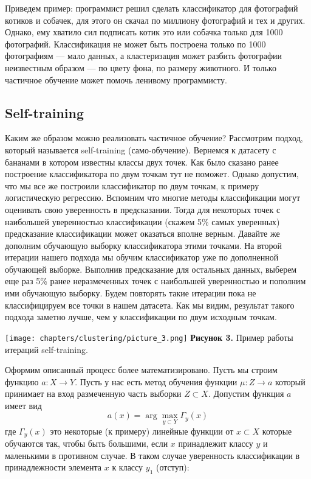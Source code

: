 Приведем пример: программист решил сделать классификатор для фотографий котиков и собачек, для этого он скачал по миллиону фотографий и тех и других. Однако, ему хватило сил подписать котик это или собачка только для 1000 фотографий. Классификация не может быть построена только по 1000 фотографиям --- мало данных, а кластеризация может разбить фотографии неизвестным образом --- по цвету фона, по размеру животного. И только частичное обучение может помочь ленивому программисту.
\subsection{Self-training}
Каким же образом можно реализовать частичное обучение? Рассмотрим подход, который называется self-training (само-обучение). Вернемся к датасету с бананами в котором известны классы двух точек. Как было сказано ранее построение классификатора по двум точкам тут не поможет. Однако допустим, что мы все же построили классификатор по двум точкам, к примеру логистическую регрессию. Вспомним что многие методы классификации могут оценивать свою уверенность в предсказании. Тогда для некоторых точек с наибольшей уверенностью классификации (скажем 5\% самых уверенных) предсказание  классификации может оказаться вполне верным. Давайте же дополним обучающую выборку классификатора этими точками. На второй итерации нашего подхода мы обучим классификатор уже по дополненной обучающей выборке. Выполнив предсказание для остальных данных, выберем еще раз 5\% ранее неразмеченных точек с наибольшей уверенностью и пополним ими обучающую выборку. Будем повторять такие итерации пока не классифицируем все точки в нашем датасета. Как мы видим, результат такого подхода заметно лучше, чем у классификации по двум исходным точкам. 
\begin{center}
\texttt{[image: chapters/clustering/picture\_3.png]}
\textbf{Рисунок 3.} Пример работы итераций self-training. 
\end{center}
Оформим описанный процесс более математизировано. Пусть мы строим функцию $a: X \longrightarrow Y$. Пусть у нас есть метод обучения функции $\mu: Z \longrightarrow a$ который принимает на вход размеченную часть выборки $Z \subset X$. Допустим функция $a$ имеет вид
\begin{equation*}
    a(x) = \arg \max_{y \subset Y}\Gamma_y(x)
\end{equation*}
где $\Gamma_y(x)$ это некоторые (к примеру) линейные функции от $x \subset X$ которые обучаются так, чтобы быть большими, если $x$ принадлежит классу $y$ и маленькими в противном случае. В таком случае уверенность классификации в принадлежности элемента $x$ к классу $y_1$ (отступ):
